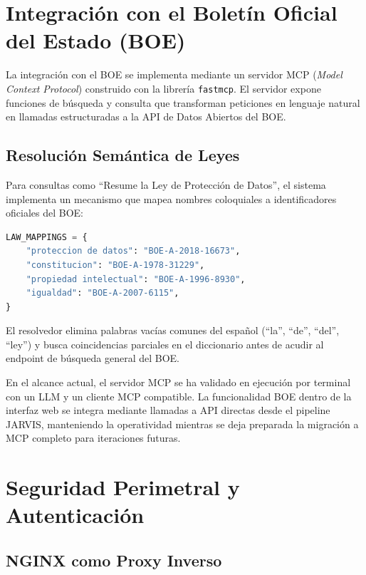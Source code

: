 \section{Integración con el Boletín Oficial del Estado (BOE)}
\label{sec:boe-impl}

La integración con el BOE se implementa mediante un servidor MCP (\textit{Model Context Protocol}) construido con la librería \texttt{fastmcp}. El servidor expone funciones de búsqueda y consulta que transforman peticiones en lenguaje natural en llamadas estructuradas a la API de Datos Abiertos del BOE.

\subsection{Resolución Semántica de Leyes}

Para consultas como ``Resume la Ley de Protección de Datos'', el sistema implementa un mecanismo que mapea nombres coloquiales a identificadores oficiales del BOE:

\begin{lstlisting}[language=Python, caption={Mapeo semántico de nombres de leyes.}]
LAW_MAPPINGS = {
    "proteccion de datos": "BOE-A-2018-16673",
    "constitucion": "BOE-A-1978-31229",
    "propiedad intelectual": "BOE-A-1996-8930",
    "igualdad": "BOE-A-2007-6115",
}
\end{lstlisting}

El resolvedor elimina palabras vacías comunes del español (``la'', ``de'', ``del'', ``ley'') y busca coincidencias parciales en el diccionario antes de acudir al endpoint de búsqueda general del BOE.

En el alcance actual, el servidor MCP se ha validado en ejecución por terminal con un LLM y un cliente MCP compatible. La funcionalidad BOE dentro de la interfaz web se integra mediante llamadas a API directas desde el pipeline JARVIS, manteniendo la operatividad mientras se deja preparada la migración a MCP completo para iteraciones futuras.

\section{Seguridad Perimetral y Autenticación}
\label{sec:seguridad-impl}

\subsection{NGINX como Proxy Inverso}

